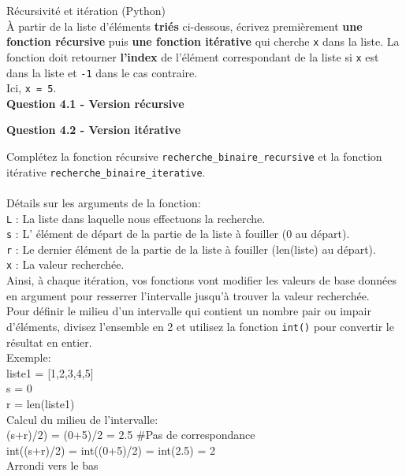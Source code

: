 \begin{Exercice}[20 minutes] Récursivité et itération (Python)\\

À partir de la liste d'éléments \textbf{triés} ci-dessous, écrivez premièrement \textbf{une fonction récursive} puis \textbf{une fonction itérative} qui cherche \lstinline{x} dans la liste. La fonction doit retourner \textbf{l'index} de l'élément correspondant de la liste si \lstinline{x} est dans la liste et \lstinline{-1} dans le cas contraire.\\
Ici, \lstinline{x = 5}.\\

\textbf{Question 4.1 - Version récursive}


\textbf{Question 4.2 - Version itérative}



    \begin{conseil}
        Complétez la fonction récursive \lstinline{recherche_binaire_recursive} et la fonction itérative \lstinline{recherche_binaire_iterative}.\\\\
        Détails sur les arguments de la fonction:\\
        \lstinline{L} : La liste dans laquelle nous effectuons la recherche.\\
        \lstinline{s} : L' élément de départ de la partie de la liste à fouiller (0 au départ).\\
        \lstinline{r} : Le dernier élément de la partie de la liste à fouiller (len(liste) au départ).\\
        \lstinline{x} : La valeur recherchée.\\

        Ainsi, à chaque itération, vos fonctions vont modifier les valeurs de base données en argument pour resserrer l'intervalle jusqu'à trouver la valeur recherchée.\\        
        Pour définir le milieu d'un intervalle qui contient un nombre pair ou impair d'éléments, divisez l'ensemble en 2 et utilisez la fonction \lstinline{int()} pour convertir le résultat en entier. \\
        Exemple:\\
            liste1 = [1,2,3,4,5]\\
            s = 0\\
            r = len(liste1)\\
            Calcul du milieu de l'intervalle:\\
            (s+r)/2) = (0+5)/2 = 2.5 \#Pas de correspondance\\
            int((s+r)/2) = int((0+5)/2) = int(2.5) = 2 \\
            Arrondi vers le bas
        \\
        

\end{conseil}
\end{Exercice}
